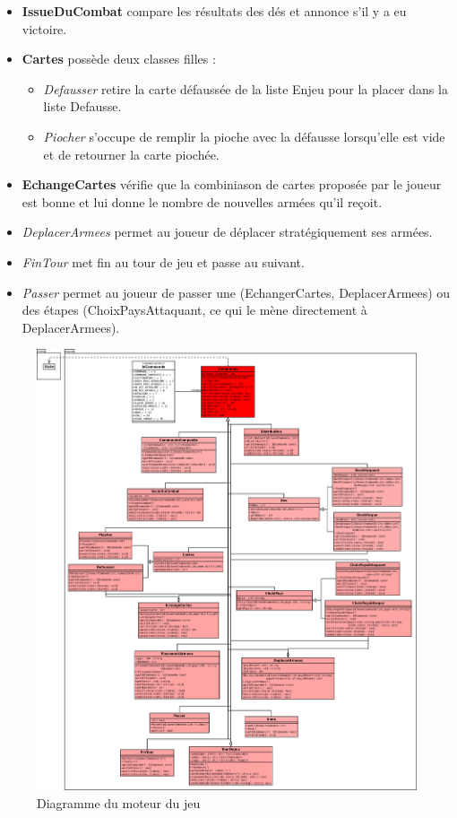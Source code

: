 \begin{itemize}
    \item \textbf{IssueDuCombat} compare les résultats des dés et annonce s'il y a eu victoire.
    
    \item \textbf{Cartes} possède deux classes filles :
    \begin{itemize}
        \item \textit{Defausser} retire la carte défaussée de la liste Enjeu pour la placer dans la liste Defausse.
        \item \textit{Piocher} s'occupe de remplir la pioche avec la défausse lorsqu'elle est vide et de retourner la carte piochée.
    \end{itemize}
    
    \item \textbf{EchangeCartes} vérifie que la combiniason de cartes proposée par le joueur est bonne et lui donne le nombre de nouvelles armées qu'il reçoit.
    
    \item \textit{DeplacerArmees} permet au joueur de déplacer stratégiquement ses armées.
    
    \item \textit{FinTour} met fin au tour de jeu et passe au suivant.
    
    \item \textit{Passer} permet au joueur de passer une (EchangerCartes, DeplacerArmees) ou des étapes (ChoixPaysAttaquant, ce qui le mène directement à DeplacerArmees).
\end{itemize}

    \begin{figure}[!htbp]
        \centering
        \includegraphics[width=17cm]{Images/engine.png}
        \caption{Diagramme du moteur du jeu}
        \label{fig:moteur}
    \end{figure}
